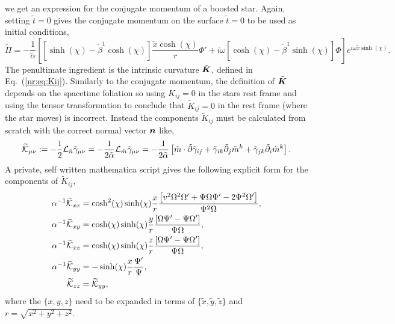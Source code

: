 we get an expression for the conjugate momentum of a boosted star. Again, setting $\tilde{t}=0$ gives the conjugate momentum on the surface $\tilde{t}=0$ to be used as initial conditions, 
\begin{equation} \widetilde{\Pi} = -\frac{1}{\tilde{\alpha}}\left[  \left[ \sinh(\chi)-\tilde{\beta}^1 \cosh(\chi)\right]\frac{\tilde{x}\cosh(\chi)}{r}\Phi' + i\omega \left[ \cosh(\chi)-\tilde{\beta}^1\sinh(\chi)\right]\Phi\right]e^{i\omega \tilde{x}\sinh(\chi)}.\end{equation}
The penultimate ingredient is the intrinsic curvature $\tilde{\boldsymbol{K}}$, defined in Eq.~(\ref{nr:eq:Kij}). Similarly to the conjugate momentum, the definition of $\tilde{\boldsymbol{K}}$ depends on the spacetime foliation so using ${K}_{ij}=0$ in the stars rest frame and using the tensor transformation to conclude that $\tilde{K}_{ij}=0$ in the rest frame (where the star moves) is incorrect. Instead the components $\tilde{K}_{ij}$ must be calculated from scratch with the correct normal vector $\boldsymbol{n}$ like,
\begin{equation} \widetilde{\mathcal{K}}_{\mu\nu} := -\frac{1}{2}\mathcal{L}_{\tilde{n}}\tilde{\gamma}_{\mu\nu} =-\frac{1}{2\tilde{\alpha}}\mathcal{L}_{\tilde{m}}\tilde{\gamma}_{\mu\nu} = -\frac{1}{2\tilde{\alpha}}\left[ \tilde m \cdot \tilde{\partial}\tilde{\gamma}_{ij} +  \tilde{\gamma}_{ik}\tilde{\partial}_j \tilde{m}^k +\tilde{\gamma}_{jk}\tilde{\partial}_i \tilde{m}^k\right].\end{equation}
A private, self written mathematica script gives the following explicit form for the components of $\tilde{K}_{ij}$,
\begin{align}\alpha^{-1} \widetilde{\mathcal{K}}_{xx} &= \cosh^2(\chi)\sinh(\chi)\frac{x }{r}\frac{ \left[v^2 \Omega^2 \Omega'+\Psi \Omega \Psi'-2 \Psi^2 \Omega'\right]}{ \Psi^2 \Omega},\\
 \alpha^{-1} \widetilde{\mathcal{K}}_{xy} &= \cosh(\chi)\sinh(\chi)\frac{ y}{r}\frac{ \left[\Omega \Psi'- \Psi \Omega'\right]}{ \Psi \Omega },\\
 \alpha^{-1} \widetilde{\mathcal{K}}_{xz} &= \cosh(\chi)\sinh(\chi)\frac{ z}{r}\frac{  \left[\Omega \Psi'- \Psi \Omega'\right]}{ \Psi \Omega },\\
 \alpha^{-1} \widetilde{\mathcal{K}}_{yy} &= -\sinh(\chi)\frac{ x }{r}\frac{ \Psi'}{  \Psi },\\
\widetilde{\mathcal{K}}_{zz}&=\widetilde{\mathcal{K}}_{yy} ,\end{align}
where the $\{x,y,z\}$ need to be expanded in terms of $\{\tilde{x},  \tilde{y}, \tilde{z} \}$ and $r = \sqrt{x^2 + y^2 + z^2}$.

